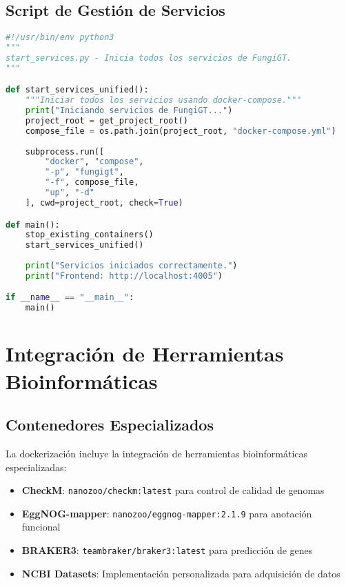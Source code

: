 \documentclass[12pt,a4paper]{article}
\begin{document}
\subsection{Script de Gestión de Servicios}

\begin{lstlisting}[language=python, caption=Script para iniciar servicios]
#!/usr/bin/env python3
"""
start_services.py - Inicia todos los servicios de FungiGT.
"""

def start_services_unified():
    """Iniciar todos los servicios usando docker-compose."""
    print("Iniciando servicios de FungiGT...")
    project_root = get_project_root()
    compose_file = os.path.join(project_root, "docker-compose.yml")
    
    subprocess.run([
        "docker", "compose",
        "-p", "fungigt",
        "-f", compose_file,
        "up", "-d"
    ], cwd=project_root, check=True)

def main():
    stop_existing_containers()
    start_services_unified()
    
    print("Servicios iniciados correctamente.")
    print("Frontend: http://localhost:4005")

if __name__ == "__main__":
    main()
\end{lstlisting}

\section{Integración de Herramientas Bioinformáticas}

\subsection{Contenedores Especializados}

La dockerización incluye la integración de herramientas bioinformáticas especializadas:

\begin{itemize}
    \item \textbf{CheckM}: \texttt{nanozoo/checkm:latest} para control de calidad de genomas
    \item \textbf{EggNOG-mapper}: \texttt{nanozoo/eggnog-mapper:2.1.9} para anotación funcional
    \item \textbf{BRAKER3}: \texttt{teambraker/braker3:latest} para predicción de genes
    \item \textbf{NCBI Datasets}: Implementación personalizada para adquisición de datos
\end{itemize}
\end{document}
